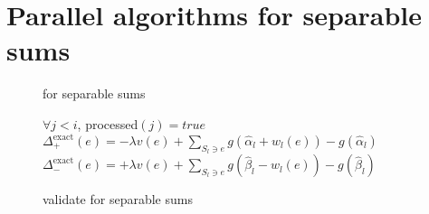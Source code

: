 \section{Parallel algorithms for separable sums}
\label{sec:sepsum}
\begin{figure}[H]
  \footnotesize
  \centering
  \begin{multicols}{2}
    \begin{minipage}{0.49\textwidth}
      \begin{algorithm}[H]
        \DontPrintSemicolon
        \caption{\hogwild{} for separable sums}
        \label{alg:hogwildsepsum}
        \;
        \;
      \end{algorithm}
      \begin{algorithm}[H]
        \DontPrintSemicolon
        \caption{\occ{} validate for separable sums}
        \label{alg:occsepsumvalidate}
        \WaitUntil $\forall j < i$, processed$(j) = true$\;
        $\Delta_+^{\text{exact}}(e) = -\lambda v(e) + \sum_{S_l\ni e} g(\hat\alpha_l + w_l(e)) - g(\hat\alpha_l)$\;
        $\Delta_-^{\text{exact}}(e) = +\lambda v(e) + \sum_{S_l\ni e} g(\hat\beta_l   - w_l(e)) - g(\hat\beta_l)$\;
      \end{algorithm}

    \end{minipage}


\end{multicols}
\end{figure}
